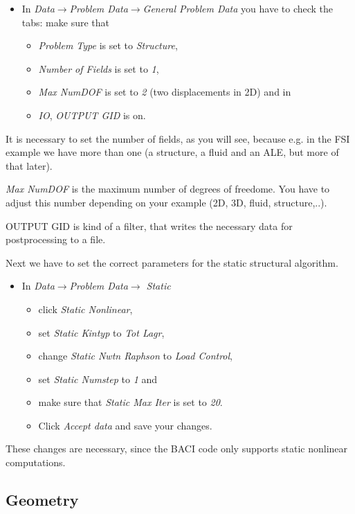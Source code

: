 \begin{itemize}
\item In \emph{Data$\to$Problem Data$\to$General Problem Data} you have
to check the tabs: make sure that

\begin{itemize}
\item \emph{Problem Type} is set to \emph{Structure},
\item \emph{Number of Fields} is set to \emph{1},
\item \emph{Max NumDOF} is set to \emph{2} (two displacements in 2D) and
in
\item \emph{IO}, \emph{OUTPUT GID} is on.
\end{itemize}
\end{itemize}
It is necessary to set the number of fields, as you will see, because
e.g. in the FSI example we have more than one (a structure, a fluid
and an ALE, but more of that later).

\emph{Max NumDOF} is the maximum number of degrees of freedome. You have to adjust
this number depending on your example (2D, 3D, fluid, structure,..).

OUTPUT GID is kind of a filter, that writes the necessary data for
postprocessing to a file.

Next we have to set the correct parameters for the static structural algorithm.
\begin{itemize}
\item In \emph{Data$\to$Problem Data$\to$ Static}
\begin{itemize}
\item click \emph{Static Nonlinear},
\item set \emph{Static Kintyp} to \emph{Tot Lagr},
\item change \emph{Static Nwtn Raphson} to \emph{Load Control},
\item set \emph{Static Numstep} to \emph{1} and
\item make sure that \emph{Static Max Iter} is set to \emph{20}.
\item Click \emph{Accept data} and save your changes.
\end{itemize}

\end{itemize}
These changes are necessary, since the BACI code only supports static nonlinear computations.

\subsection{Geometry}

